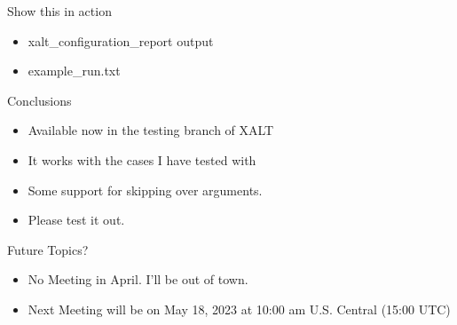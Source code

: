 \documentclass{beamer}
\begin{document}
\begin{frame}{Show this in action}
  \begin{itemize}
    \item xalt\_configuration\_report output
    \item example\_run.txt
  \end{itemize}
\end{frame}

\begin{frame}{Conclusions}
  \begin{itemize}
    \item Available now in the testing branch of XALT
    \item It works with the cases I have tested with
    \item Some support for skipping over arguments.
    \item Please test it out.
  \end{itemize}
\end{frame}

\begin{frame}{Future Topics?}
  \begin{itemize}
    \item No Meeting in April.  I'll be out of town.
    \item Next Meeting will be on May 18, 2023 at 10:00 am
      U.S. Central (15:00 UTC)
  \end{itemize}
\end{frame}

%
\end{document}
